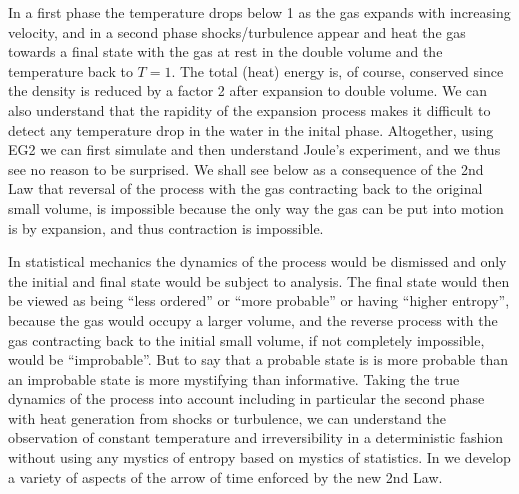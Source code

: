 In a first phase the temperature drops below 1 as the gas expands with
increasing velocity, and in a second phase shocks/turbulence appear
and heat the gas towards a final state with the gas at rest in the
double volume and the temperature back to $T =1$.  The total (heat)
energy is, of course, conserved since the density is reduced by a
factor 2 after expansion to double volume. We can also understand that
the rapidity of the expansion process makes it difficult to detect any
temperature drop in the water in the inital phase. Altogether, using
EG2 we can first simulate and then understand Joule's experiment, and
we thus see no reason to be surprised. We shall see below as a
consequence of the 2nd Law that reversal of the process with the gas
contracting back to the original small volume, is impossible because
the only way the gas can be put into motion is by expansion, and thus
contraction is impossible.

In statistical mechanics the dynamics of the process would be
dismissed and only the initial and final state would be subject to
analysis. The final state would then be viewed as being ``less
ordered'' or ``more probable'' or having ``higher entropy'', because
the gas would occupy a larger volume, and the reverse process with the
gas contracting back to the initial small volume, if not completely
impossible, would be ``improbable''. But to say that a probable state
is is more probable than an improbable state is more mystifying than
informative. Taking the true dynamics of the process into account
including in particular the second phase with heat generation from
shocks or turbulence, we can understand the observation of constant
temperature and irreversibility in a deterministic fashion without
using any mystics of entropy based on mystics of statistics. In
\cite{arrow} we develop a variety of aspects of the arrow of time
enforced by the new 2nd Law.




